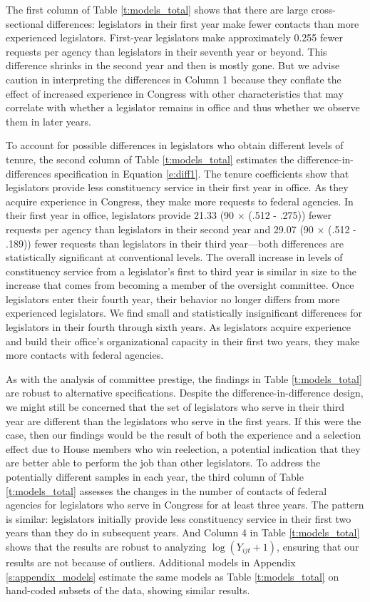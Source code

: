 \documentclass[12pt]{article}
\begin{document}
{The first column of Table \ref{t:models_total} shows that there are large cross-sectional differences: legislators in their first year make fewer contacts than more experienced legislators. First-year legislators make approximately 0.255 fewer requests per agency than legislators in their seventh year or beyond. This difference shrinks in the second year and then is mostly gone. But we advise caution in interpreting the differences in Column 1 because they conflate the effect of increased experience in Congress with other characteristics that may correlate with whether a legislator remains in office and thus whether we observe them in later years.   

To account for possible differences in legislators who obtain different levels of tenure, the second column of Table \ref{t:models_total} estimates the difference-in-differences specification in Equation \ref{e:diff1}. The tenure coefficients show that legislators provide less constituency service in their first year in office. As they acquire experience in Congress, they make more requests to federal agencies. In their first year in office, legislators provide 21.33 (90 $\times$ (.512 - .275)) fewer requests per agency than legislators in their second year and 29.07 (90 $\times$ (.512 - .189)) fewer requests than legislators in their third year---both differences are statistically significant at conventional levels. The overall increase in levels of constituency service from a legislator's first to third year is similar in size to the increase that comes from becoming a member of the oversight committee. Once legislators enter their fourth year, their behavior no longer differs from more experienced legislators. We find small and statistically insignificant differences for legislators in their fourth through sixth years. As legislators acquire experience and build their office's organizational capacity in their first two years, they make more contacts with federal agencies.  

As with the analysis of committee prestige, the findings in Table \ref{t:models_total} are robust to alternative specifications. Despite the difference-in-difference design, we might still be concerned that the set of legislators who serve in their third year are different than the legislators who serve in the first years. If this were the case, then our findings would be the result of both the experience and a selection effect due to House members who win reelection, a potential indication that they are better able to perform the job than other legislators. To address the potentially different samples in each year, the third column of Table \ref{t:models_total} assesses the changes in the number of contacts of federal agencies for legislators who serve in Congress for at least three years. The pattern is similar: legislators initially provide less constituency service in their first two years than they do in subsequent years. And Column 4 in Table \ref{t:models_total} shows that the results are robust to analyzing $\log(Y_{ijt} + 1)$, ensuring that our results are not because of outliers. Additional models in Appendix \ref{s:appendix_models} estimate the same models as Table \ref{t:models_total} on hand-coded subsets of the data, showing similar results. 

}
\end{document}
